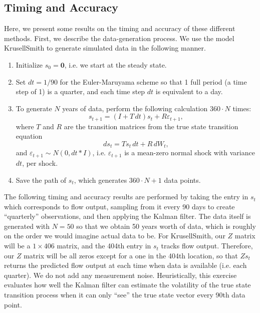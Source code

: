 \documentclass[12 pt, oneside]{article}
\theoremstyle{definition}
\theoremstyle{definition}
\theoremstyle{definition}
\newcommand{\bfzero}{\mathbf{0}}
\begin{document}
\subsection{Timing and Accuracy}
Here, we present some results on the timing and accuracy of these different methods. First, we describe the data-generation process. We use the model KrusellSmith to generate simulated data in the following manner.
\begin{enumerate}
\item Initialize $s_0 = \bfzero$, i.e. we start at the steady state.
\item Set $dt = 1/90$ for the Euler-Maruyama scheme so that 1 full period (a time step of 1) is a quarter, and each time step $dt$ is equivalent to a day.
\item To generate $N$ years of data, perform the following calculation $360\cdot N$ times:
\[s_{t+1} = (I + T\,dt)s_t + R \varepsilon_{t+1},  \]
where $T$ and $R$ are the transition matrices from the true state transition equation
\[ds_t = Ts_t\, dt + R\, dW_t,  \]
and $\varepsilon_{t+1}\sim N(0, dt * I)$, i.e. $\varepsilon_{t+1}$ is a mean-zero normal shock with variance $dt$, per shock.
\item Save the path of $s_t$, which generates $360\cdot N + 1$ data points.
\end{enumerate}
The following timing and accuracy results are performed by taking the entry in $s_t$ which corresponds to flow output, sampling from it every 90 days to create ``quarterly'' observations, and then applying the Kalman filter. The data itself is generated with $N = 50$ so that we obtain 50 years worth of data, which is roughly on the order we would imagine actual data to be. For KrusellSmith, our $Z$ matrix will be a $1\times 406$ matrix, and the 404th entry in $s_t$ tracks flow output. Therefore, our $Z$ matrix will be all zeros except for a one in the 404th location, so that $Zs_t$ returns the predicted flow output at each time when data is available (i.e. each quarter). We do not add any measurement noise. Heuristically, this exercise evaluates how well the Kalman filter can estimate the volatility of the true state transition process when it can only ``see'' the true state vector every 90th data point.
\end{document}

